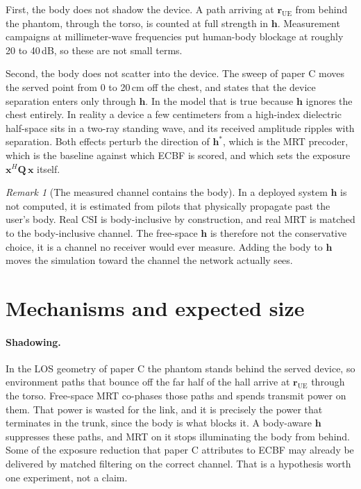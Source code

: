 \documentclass[11pt]{article}
\newcommand{\rr}{\mathbf{r}}
\newcommand{\xx}{\mathbf{x}}
\newcommand{\hh}{\mathbf{h}}
\newcommand{\Qmat}{\mathbf{Q}}
\newcommand{\rue}{\rr_{\mathrm{UE}}}
\theoremstyle{remark}
\newtheorem{remark}{Remark}
\begin{document}
First, the body does not shadow the device. A path arriving at $\rue$
from behind the phantom, through the torso, is counted at full
strength in $\hh$. Measurement campaigns at millimeter-wave
frequencies put human-body blockage at roughly 20 to 40\,dB, so these
are not small terms.

Second, the body does not scatter into the device. The sweep of
paper C moves the served point from 0 to 20\,cm off the chest, and
states that the device separation enters only through $\hh$. In the
model that is true because $\hh$ ignores the chest entirely. In
reality a device a few centimeters from a high-index dielectric
half-space sits in a two-ray standing wave, and its received amplitude
ripples with separation. Both effects perturb the direction of
$\hh^{*}$, which is the MRT precoder, which is the baseline against
which ECBF is scored, and which sets the exposure
$\xx^H \Qmat\, \xx$ itself.

\begin{remark}[The measured channel contains the body]
In a deployed system $\hh$ is not computed, it is estimated from
pilots that physically propagate past the user's body. Real CSI is
body-inclusive by construction, and real MRT is matched to the
body-inclusive channel. The free-space $\hh$ is therefore not the
conservative choice, it is a channel no receiver would ever measure.
Adding the body to $\hh$ moves the simulation toward the channel the
network actually sees.
\end{remark}

\section{Mechanisms and expected size}

\paragraph{Shadowing.}
In the LOS geometry of paper C the phantom stands behind the served
device, so environment paths that bounce off the far half of the hall
arrive at $\rue$ through the torso. Free-space MRT co-phases those
paths and spends transmit power on them. That power is wasted for the
link, and it is precisely the power that terminates in the trunk,
since the body is what blocks it. A body-aware $\hh$ suppresses these
paths, and MRT on it stops illuminating the body from behind. Some of
the exposure reduction that paper C attributes to ECBF may already be
delivered by matched filtering on the correct channel. That is a
hypothesis worth one experiment, not a claim.
\end{document}
